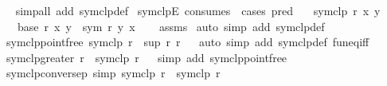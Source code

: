 \begin{isabellebody}
%
\isadelimproof
\ \ %
\endisadelimproof
%
\isatagproof
{}\isamarkupfalse%
{\isacharparenleft}{\kern0pt}simp{\isacharunderscore}{\kern0pt}all\ add{\isacharcolon}{\kern0pt}\ symclp{\isacharunderscore}{\kern0pt}def{\isacharparenright}{\kern0pt}%
\endisatagproof
{\isafoldproof}%
%
\isadelimproof
\isanewline
%
\endisadelimproof
\isanewline
{}\isamarkupfalse%
\ symclpE\ {\isacharbrackleft}{\kern0pt}consumes\ {}{\isacharcomma}{\kern0pt}\ cases\ pred{\isacharbrackright}{\kern0pt}{\isacharcolon}{\kern0pt}\isanewline
\ \ \ {\isachardoublequoteopen}symclp\ r\ x\ y{\isachardoublequoteclose}\isanewline
\ \ \ {\isacharparenleft}{\kern0pt}base{\isacharparenright}{\kern0pt}\ {\isachardoublequoteopen}r\ x\ y{\isachardoublequoteclose}\ {\isacharbar}{\kern0pt}\ {\isacharparenleft}{\kern0pt}sym{\isacharparenright}{\kern0pt}\ {\isachardoublequoteopen}r\ y\ x{\isachardoublequoteclose}\isanewline
%
\isadelimproof
\ \ %
\endisadelimproof
%
\isatagproof
{}\isamarkupfalse%
\ assms\ \isamarkupfalse%
{\isacharparenleft}{\kern0pt}auto\ simp\ add{\isacharcolon}{\kern0pt}\ symclp{\isacharunderscore}{\kern0pt}def{\isacharparenright}{\kern0pt}%
\endisatagproof
{\isafoldproof}%
%
\isadelimproof
\isanewline
%
\endisadelimproof
\isanewline
{}\isamarkupfalse%
\ symclp{\isacharunderscore}{\kern0pt}pointfree{\isacharcolon}{\kern0pt}\ {\isachardoublequoteopen}symclp\ r\ {\isacharequal}{\kern0pt}\ sup\ r\ r{\isasyminverse}{\isasyminverse}{\isachardoublequoteclose}\isanewline
%
\isadelimproof
\ \ %
\endisadelimproof
%
\isatagproof
{}\isamarkupfalse%
{\isacharparenleft}{\kern0pt}auto\ simp\ add{\isacharcolon}{\kern0pt}\ symclp{\isacharunderscore}{\kern0pt}def\ fun{\isacharunderscore}{\kern0pt}eq{\isacharunderscore}{\kern0pt}iff{\isacharparenright}{\kern0pt}%
\endisatagproof
{\isafoldproof}%
%
\isadelimproof
\isanewline
%
\endisadelimproof
\isanewline
{}\isamarkupfalse%
\ symclp{\isacharunderscore}{\kern0pt}greater{\isacharcolon}{\kern0pt}\ {\isachardoublequoteopen}r\ {\isasymle}\ symclp\ r{\isachardoublequoteclose}\isanewline
%
\isadelimproof
\ \ %
\endisadelimproof
%
\isatagproof
{}\isamarkupfalse%
{\isacharparenleft}{\kern0pt}simp\ add{\isacharcolon}{\kern0pt}\ symclp{\isacharunderscore}{\kern0pt}pointfree{\isacharparenright}{\kern0pt}%
\endisatagproof
{\isafoldproof}%
%
\isadelimproof
\isanewline
%
\endisadelimproof
\isanewline
{}\isamarkupfalse%
\ symclp{\isacharunderscore}{\kern0pt}conversep\ {\isacharbrackleft}{\kern0pt}simp{\isacharbrackright}{\kern0pt}{\isacharcolon}{\kern0pt}\ {\isachardoublequoteopen}symclp\ r{\isasyminverse}{\isasyminverse}\ {\isacharequal}{\kern0pt}\ symclp\ r{\isachardoublequoteclose}\isanewline

\end{isabellebody}
